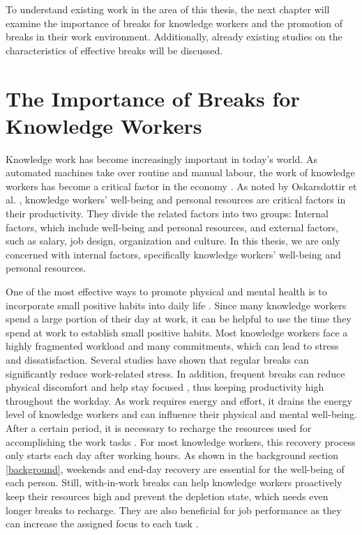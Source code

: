 \documentclass{hasel_thesis}
\begin{document}
To understand existing work in the area of this thesis, the next chapter will examine the importance of breaks for knowledge workers and the promotion of breaks in their work environment. Additionally, already existing studies on the characteristics of effective breaks will be discussed.

\section{The Importance of Breaks for Knowledge Workers}

Knowledge work has become increasingly important in today's world. As automated machines take over routine and manual labour, the work of knowledge workers has become a critical factor in the economy \cite{Oskarsdottir.2022}. As noted by Oskarsdottir et al. \cite{Oskarsdottir.2022}, knowledge workers' well-being and personal resources are critical factors in their productivity. They divide the related factors into two groups: Internal factors, which include well-being and personal resources, and external factors, such as salary, job design, organization and culture.
In this thesis, we are only concerned with internal factors, specifically knowledge workers' well-being and personal resources.

One of the most effective ways to promote physical and mental health is to incorporate small positive habits into daily life \cite{Taylor.2005}. Since many knowledge workers spend a large portion of their day at work, it can be helpful to use the time they spend at work to establish small positive habits. Most knowledge workers face a highly fragmented workload and many commitments, which can lead to stress and dissatisfaction. Several studies \cite{Largo-Wight.2017, KimS.ParkY.&Niu.2017} have shown that regular breaks can significantly reduce work-related stress. In addition, frequent breaks can reduce physical discomfort \cite{Waongenngarm.2018} and help stay focused \cite{Packer.2021}, thus keeping productivity high throughout the workday.
As work requires energy and effort, it drains the energy level of knowledge workers and can influence their physical and mental well-being. After a certain period, it is necessary to recharge the resources used for accomplishing the work tasks \cite{Sonnentag.2006}. For most knowledge workers, this recovery process only starts each day after working hours. As shown in the background section \ref{background}, weekends and end-day recovery are essential for the well-being of each person. Still, with-in-work breaks can help knowledge workers proactively keep their resources high and prevent the depletion state, which needs even longer breaks to recharge. They are also beneficial for job performance as they can increase the assigned focus to each task \cite{Trougakos.2009}. 
\end{document}

